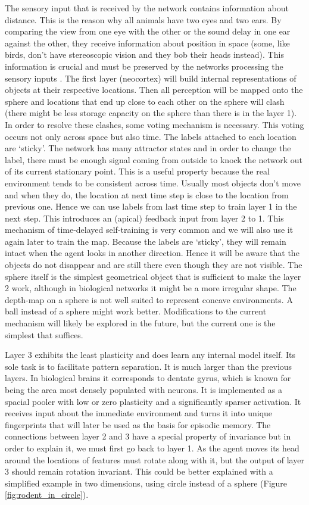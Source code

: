 \documentclass[12pt]{article}
\begin{document}
The sensory input that is received by the network contains information about distance. This is the reason why all animals have two eyes and two ears. By comparing the view from one eye with the other or the sound delay in one ear against the other, they receive information about position in space (some, like birds, don't have stereoscopic vision and they bob their heads instead). This information is crucial and must be preserved by the networks processing the sensory inputs \cite{Object_vector_coding, Neuronal_vector_coding_in_spatial_cognition}.  The first layer (neocortex) will build internal representations of objects at their respective locations. Then all perception will be mapped onto the sphere and locations that end up close to each other on the sphere will clash (there might be less storage capacity on the sphere than there is in the layer 1). In order to resolve these clashes, some voting mechanism is necessary. This voting occurs not only across space but also time. The labels attached to each location are `sticky'. The network has many attractor states and in order to change the label, there must be enough signal coming from outside to knock the network out of its current stationary point. This is a useful property because the real environment tends to be consistent across time. Usually most objects don't move and when they do, the location at next time step is close to the location from previous one. Hence we can use labels from last time step to train layer 1 in the next step. This introduces an (apical) feedback input from layer 2 to 1.
This mechanism of time-delayed self-training is very common and we will also use it again later to train the map.
Because the labels are `sticky', they will remain intact when the agent looks in another direction. Hence it will be aware that the objects do not disappear and are still there even though they are not visible. The sphere itself is the simplest geometrical object that is sufficient to make the layer 2 work, although in biological networks it might be a more irregular shape. The depth-map on a sphere is not well suited to represent concave environments. A ball instead of a sphere might work better. Modifications to the current mechanism will likely be explored in the future, but the current one is the simplest that suffices. 

Layer 3 exhibits the least plasticity and does learn any internal model itself. Its sole task is to facilitate pattern separation. It is much larger than the previous layers. In biological brains it corresponds to dentate gyrus, which is known for being the area most densely populated with neurons. It is implemented as a spacial pooler with low or zero plasticity and a significantly sparser activation. It receives input about the immediate environment and turns it into unique fingerprints that will later be used as the basis for episodic memory.  The connections between layer 2 and 3 have a special property of invariance but in order to explain it, we must first go back to layer 1. As the agent moves its head around the locations of features must rotate along with it, but the output of layer 3 should remain rotation invariant. This could be better explained with a simplified example in two dimensions, using circle instead of a sphere (Figure \ref{fig:rodent_in_circle}). 
\end{document}
